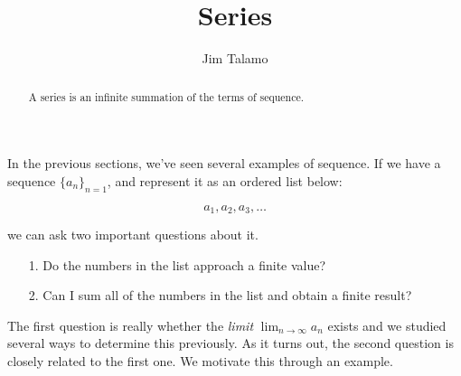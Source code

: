 \documentclass{ximera}
\author{Jim Talamo}
\title[Dig-In:]{Series}
\begin{document}
\begin{abstract}
A series is an infinite summation of the terms of sequence.
\end{abstract}
\maketitle

In the previous sections, we've seen several examples of sequence.  If we have a sequence $\{a_n\}_{n=1}$, and represent it as an ordered list below: 

\[
a_1, a_2, a_3 , \ldots
\]

we can ask two important questions about it.

\begin{itemize}
\item[1.] Do the numbers in the list approach a finite value?
\item[2.] Can I sum all of the numbers in the list and obtain a finite result?
\end{itemize}

The first question is really whether the \emph{limit} $\lim_{n \to \infty} a_n$ exists and we studied several ways to determine this previously.  As it turns out, the second question is closely related to the first one.  We motivate this through an example.
\end{document}
